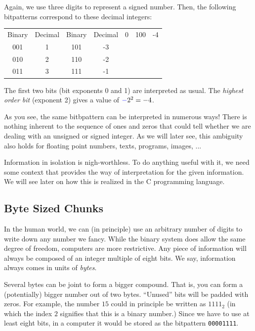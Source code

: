 \begin{defbox}
Again, we use three digits to represent a signed number. Then, the following bitpatterns correspond to these decimal integers:

\begin{center}
\begin{tabular}{cc|cc}
Binary & Decimal & Binary & Decimal  & 0 & 100 & -4 \\
001 & 1 & 101 & -3 \\
010 & 2 & 110 & -2 \\
011 & 3 & 111 & -1
\end{tabular}
\end{center}

The first two bits (bit exponents 0 and 1) are interpreted as usual. The \emph{highest order bit} (exponent 2) gives a value of ${\color{blue}-}2^2 = -4$.
\end{defbox}

\begin{hintbox}
As you see, the same bitbpattern can be interpreted in numerous ways! There is nothing inherent to the sequence of ones and zeros that could tell whether we are dealing with an unsigned or signed integer. As we will later see, this ambiguity also holds for floating point numbers, texts, programs, images, ...

Information in isolation is nigh-worthless. To do anything useful with it, we need some context that provides the way of interpretation for the given information. We will see later on how this is realized in the C programming language.
\end{hintbox}

\subsection{Byte Sized Chunks}
In the human world, we can (in principle) use an arbitrary number of digits to write down any number we fancy. While the binary system does allow the same degree of freedom, computers are more restrictive. Any piece of information will always be composed of an integer multiple of eight bits. We say, information always comes in units of \emph{bytes}.

Several bytes can be joint to form a bigger compound. That is, you can form a (potentially) bigger number out of two bytes. \enquote{Unused} bits will be padded with zeros. For example, the number $15$ could in principle be written as $1111_2$ (in which the index $2$ signifies that this is a binary number.) Since we have to use at least eight bits, in a computer it would be stored as the bitpattern \texttt{00001111}.


